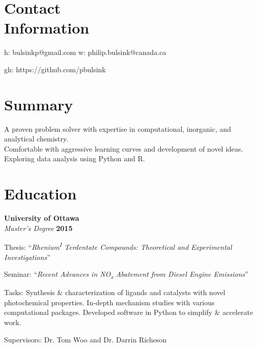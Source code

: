 \documentclass[margin,line]{resumecls}
\begin{document}
\thispagestyle{plain}
\begin{resume}

    \section{\mysidestyle Contact\\Information}

    h: bulsinkp@gmail.com \hspace{60mm} w: philip.bulsink@canada.ca
\vspace{-4.5mm}

    gh: https://github.com/pbulsink
    \\\vspace{-4.5mm}


    \section{\mysidestyle Summary}

    A proven problem solver with expertise in computational, inorganic, and analytical chemistry.\\ Comfortable with aggressive learning curves and development of novel ideas.\\ Exploring data analysis using Python and R.


    \section{\mysidestyle Education}

    \textbf{University of Ottawa}\\\vspace{1mm}%
    \textsl{Master's Degree} \hfill \textbf{2015}\vspace{-3mm}\\\vspace{-1mm}%
    \begin{list2}
        \item Thesis: ``\textit{Rhenium\textsuperscript{I} Terdentate Compounds: Theoretical and Experimental Investigations}''
        \item Seminar: ``\textit{Recent Advances in NO\textsubscript{x} Abatement from Diesel Engine Emissions}''
        \item Tasks: Synthesis \& characterization of ligands and catalysts with novel photochemical properties.
        In-depth mechanism studies with various computational packages.
        Developed software in Python to simplify \& accelerate work.
        \item Supervisors: Dr. Tom Woo and Dr. Darrin Richeson
    \end{list2}


\end{resume}
\end{document}
